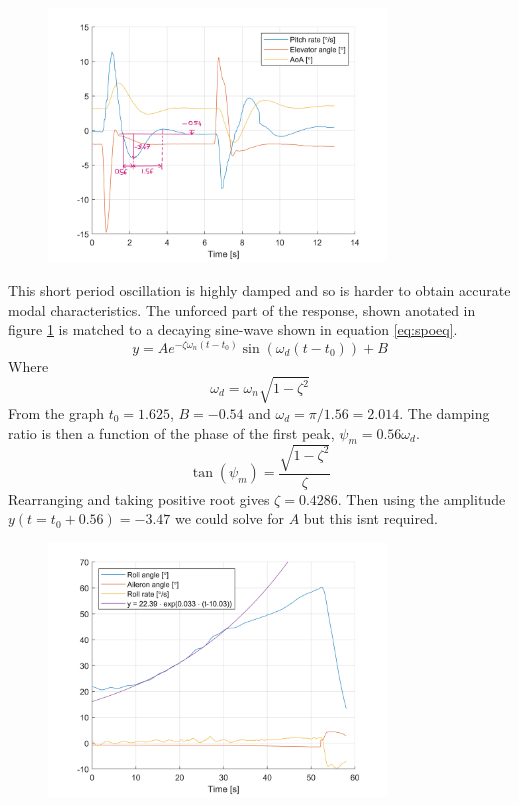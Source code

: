 \documentclass{article}
\begin{document}
\begin{figure}[H]
  \centering
  \includegraphics[width=0.8\textwidth]{figures/anSPO.png}
  \caption{}
  \label{fig:spo}
\end{figure}

This short period oscillation is highly damped and so is harder to obtain accurate modal characteristics.
The unforced part of the response, shown anotated in figure \ref{fig:spo} is matched to a decaying sine-wave shown in equation \ref{eq:spoeq}.
\begin{equation}
  y = Ae^{-\zeta\omega_{n}(t - t_{0})}\sin(\omega_{d}(t - t_{0})) + B
  \label{eq:spoeq}
\end{equation}
Where
\begin{equation}
  \omega_{d} = \omega_{n}\sqrt{1 - \zeta^{2}}
\end{equation}
From the graph $t_0 = 1.625$, $B=-0.54$ and $\omega_d = \pi/1.56 = 2.014$.
The damping ratio is then a function of the phase of the first peak, $\psi_m = 0.56\omega_d$.
\begin{equation}
  \tan(\psi_m) = \frac{\sqrt{1-\zeta^2}}{\zeta}
\end{equation}
Rearranging and taking positive root gives $\zeta= 0.4286$.
Then using the amplitude $y(t=t_0 + 0.56) = -3.47$ we could solve for $A$ but this isnt required.

\begin{figure}[H]
  \centering
  \includegraphics[width=0.8\textwidth]{figures/Spiral.png}
  \caption{}
  \label{fig:spiral}
\end{figure}
\end{document}
